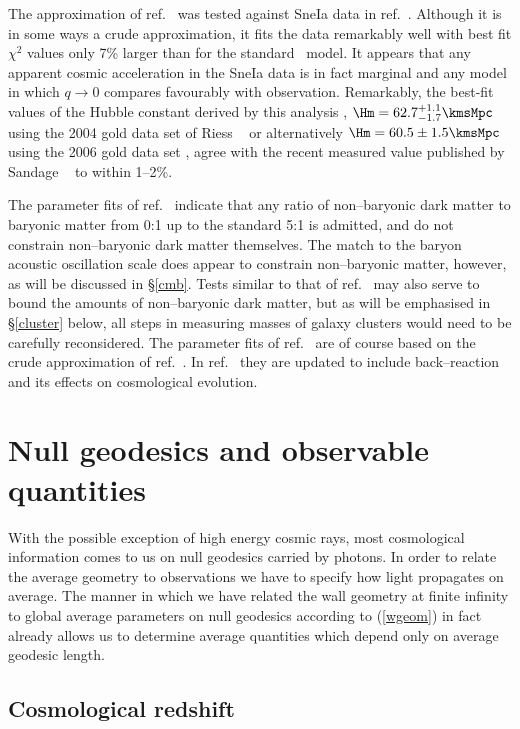 \documentclass[12pt]{iopart}
\begin{document}
The approximation of ref.\ \cite{paper0} was tested against
SneIa data in ref.\ \cite{paper1}. Although it is in some ways a
crude approximation, it fits the data remarkably well with best fit $\chi^2$
values only 7\% larger than for the standard \LCDM\ model. It appears that any
apparent cosmic acceleration in the SneIa data is in fact marginal and any
model in which $q\to0$ compares favourably with observation. Remarkably,
the best-fit values of the Hubble constant derived by this analysis
\cite{paper1}, $\Hm=62.7^{+1.1}_{-1.7}\kmsMpc$ using the
2004 gold data set of Riess \etal~\cite{Riess04} or alternatively
$\Hm=60.5\pm1.5\kmsMpc$ using the 2006 gold data set \cite{Riess06},
agree with the recent measured value published by
Sandage \etal\ \cite{Sandage} to within 1--2\%.

The parameter fits of ref.\ \cite{paper1} indicate that any ratio of
non--baryonic dark matter to baryonic matter from 0:1 up to the standard
5:1 is admitted, and do not constrain non--baryonic dark matter themselves.
The match to the baryon acoustic oscillation scale does appear to constrain
non--baryonic matter, however, as will be discussed in \S\ref{cmb}.
Tests similar to that of ref.\ \cite{Allen} may also serve
to bound the amounts of non--baryonic dark matter,
but as will be emphasised in \S\ref{cluster} below, all steps in
measuring masses of galaxy clusters would need to be carefully
reconsidered.
The parameter fits of ref.\ \cite{paper1} are of course based on the
crude approximation of ref.\ \cite{paper0}. In ref.\ \cite{paper2}
they are updated to include back--reaction and its effects on cosmological
evolution.

\section{Null geodesics and observable quantities\label{obs}}

With the possible exception of high energy cosmic rays, most cosmological
information comes to us on null geodesics carried by photons. In order
to relate the average geometry to observations we have to specify how
light propagates on average. The manner in which we have related the
wall geometry at finite infinity to global average parameters on
null geodesics according to (\ref{wgeom}) in fact already allows us
to determine average quantities which depend only on average geodesic
length.

\subsection{Cosmological redshift\label{red}}
\end{document}
